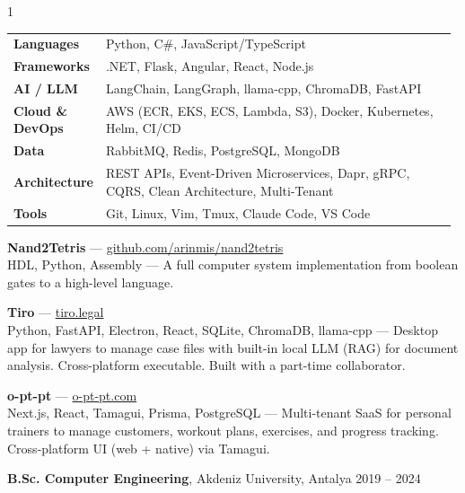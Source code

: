 \documentclass[11pt,a4paper]{altacv}
\begin{document}
\begin{paracol}{1}
{\small\vspace{2pt}
\begin{tabular}{p{0.18\linewidth} p{0.8\linewidth}}
\textbf{Languages}      & Python, C\#, JavaScript/TypeScript \\
\textbf{Frameworks}     & .NET, Flask, Angular, React, Node.js \\
\textbf{AI / LLM}        & LangChain, LangGraph, llama-cpp, ChromaDB, FastAPI \\
\textbf{Cloud \& DevOps} & AWS (ECR, EKS, ECS, Lambda, S3), Docker, Kubernetes, Helm, CI/CD \\
\textbf{Data}           & RabbitMQ, Redis, PostgreSQL, MongoDB \\
\textbf{Architecture}   & REST APIs, Event-Driven Microservices, Dapr, gRPC, CQRS, Clean Architecture, Multi-Tenant \\
\textbf{Tools}          & Git, Linux, Vim, Tmux, Claude Code, VS Code \\
\end{tabular}\smallskip
}

\textbf{Nand2Tetris} — \href{https://github.com/arinmis/nand2tetris}{github.com/arinmis/nand2tetris} \\
HDL, Python, Assembly — A full computer system implementation from boolean gates to a high-level language.

\textbf{Tiro} — \href{https://tiro.legal}{tiro.legal} \\
Python, FastAPI, Electron, React, SQLite, ChromaDB, llama-cpp — Desktop app for lawyers to manage case files with built-in local LLM (RAG) for document analysis. Cross-platform executable. Built with a part-time collaborator.

\textbf{o-pt-pt} — \href{https://o-pt-pt.com}{o-pt-pt.com} \\
Next.js, React, Tamagui, Prisma, PostgreSQL — Multi-tenant SaaS for personal trainers to manage customers, workout plans, exercises, and progress tracking. Cross-platform UI (web + native) via Tamagui.

\textbf{B.Sc. Computer Engineering}, Akdeniz University, Antalya \hfill 2019 -- 2024

\end{paracol}
\end{document}
